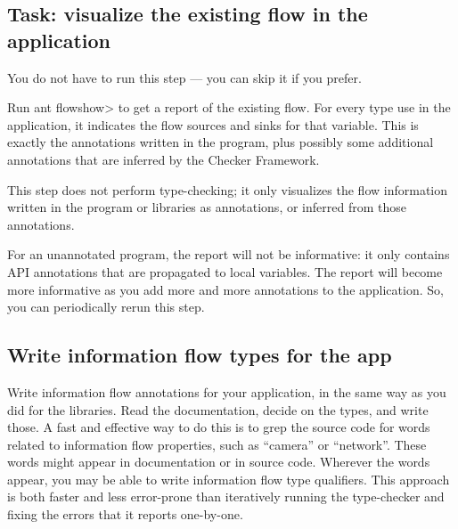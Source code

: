 \subsection{Task: visualize the existing flow in the application}

You do not have to run this step --- you can skip it if you
prefer.


Run \<ant flowshow> to get a report of the
existing flow.
For every type use in the application, it indicates the flow sources
and sinks for that variable. This is exactly the annotations written
in the program, plus possibly some additional annotations that are
inferred by the Checker Framework.


This step does not perform type-checking; it only visualizes the flow
information written in the program or libraries as annotations, or
inferred from those annotations.


For an unannotated program, the report will not be informative: it
only contains API annotations that are propagated to local
variables. The report will become more informative as you add more and
more annotations to the application. So, you can periodically rerun
this step. 


\subsection{Write information flow types for the app\label{flow-task-annotate-app}}

Write information flow annotations for your application, in the same way as
you did for the libraries.  Read the documentation, decide on the types,
and write those.  A fast and effective way to do this is to grep the source
code for words related to information flow properties, such as ``camera''
or ``network''.  These words might appear in documentation or in source
code.  Wherever the words appear, you may be able to write information flow
type qualifiers.  This approach is both faster and less error-prone than
iteratively running the type-checker and fixing the errors that it reports
one-by-one.



